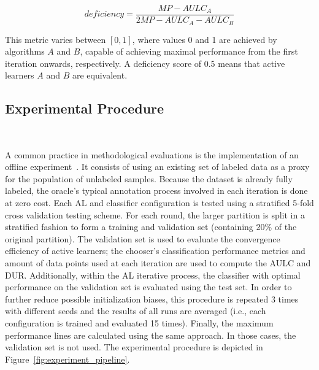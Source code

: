 \documentclass[parskip=full]{scrartcl}
\begin{document}
\begin{equation}
    deficiency = \frac{MP-AULC_A}{2MP-AULC_A-AULC_B} 
\end{equation}

This metric varies between $[0,1]$, where values 0 and 1 are achieved by
algorithms $A$ and $B$, capable of achieving maximal performance from the first
iteration onwards, respectively. A deficiency score of 0.5 means that active
learners $A$ and $B$ are equivalent.

\subsection{Experimental Procedure}~\label{sec:experimental_procedure}

A common practice in methodological evaluations is the implementation of an
offline experiment~\cite{Kagy2019}. It consists of using an existing set of
labeled data as a proxy for the population of unlabeled samples. Because the
dataset is already fully labeled, the oracle's typical annotation process
involved in each iteration is done at zero cost. Each AL and classifier
configuration is tested using a stratified 5-fold cross validation testing
scheme. For each round, the larger partition is split in a stratified fashion
to form a training and validation set (containing 20\% of the original
partition).  The validation set is used to evaluate the convergence efficiency
of active learners; the chooser's classification performance metrics and amount
of data points used at each iteration are used to compute the AULC and DUR\@.
Additionally, within the AL iterative process, the classifier with optimal
performance on the validation set is evaluated using the test set. In order to
further reduce possible initialization biases, this procedure is repeated 3
times with different seeds and the results of all runs are averaged (i.e., each
configuration is trained and evaluated 15 times). Finally, the maximum
performance lines are calculated using the same approach. In those cases, the
validation set is not used. The experimental procedure is depicted in
Figure~\ref{fig:experiment_pipeline}.
\end{document}
